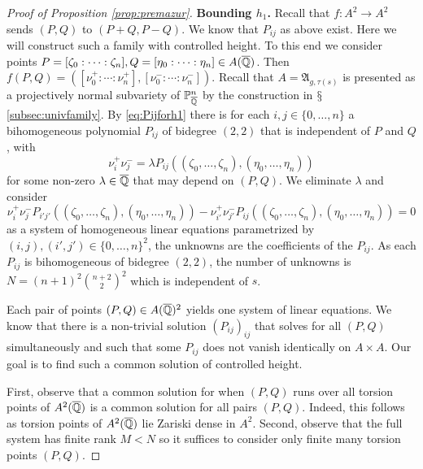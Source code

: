 \begin{proof}[Proof of Proposition \ref{prop:premazur}]
  \medskip
  \textbf{Bounding $h_1$.}\label{page:boundh1} %
  Recall that $f\colon A^2\rightarrow A^2$ sends $(P,Q)$ to
  $(P+Q,P-Q)$. We know that $P_{ij}$ as above exist. Here we will
  construct such a family with controlled height. To this end we
  consider points $P=[\zeta_0:\cdots:\zeta_n],Q=[\eta_0:\cdots:\eta_n]
  \in A({\overline{\mathbb{Q}}})$. Then $f(P,Q) = ([\nu^+_0:\cdots
  :\nu^+_n],[\nu^-_0:\cdots:\nu^-_n])$. Recall that
  $A=\mathfrak{A}_{g,\tau(s)}$ is presented as a projectively normal
  subvariety of ${\mathbb{P}}^n_{\overline{\mathbb{Q}}}$ by the construction in
  $\mathsection$\ref{subsec:univfamily}. By \eqref{eq:Pijforh1}  there
  is for each $i,j\in \{0,\ldots,n\}$
  a bihomogeneous polynomial $P_{ij}$ of bidegree $(2,2)$ that is
  independent of $P$ and $Q$, with
  \begin{equation}
    \label{eq:inhomlinearsystemforh1}
    \nu^+_i \nu^-_j = \lambda P_{ij}((\zeta_0,\ldots,\zeta_n),(\eta_0,\ldots,\eta_n))
  \end{equation}
  for some non-zero $\lambda\in{\overline{\mathbb{Q}}}$ that may depend on $(P,Q)$. 
  We  eliminate $\lambda$ and consider  
  \begin{equation}
    \label{eq:linearsystemforh1}
    \nu^+_i \nu^-_jP_{i'j'}((\zeta_0,\ldots,\zeta_n),(\eta_0,\ldots,\eta_n)) - \nu^+_{i'} \nu^-_{j'}P_{ij}((\zeta_0,\ldots,\zeta_n),(\eta_0,\ldots,\eta_n))=0
  \end{equation}
  as a system of homogeneous linear equations 
  parametrized by $(i,j),(i',j')\in \{0,\ldots,n\}^2$, the unknowns are
  the coefficients of the $P_{ij}$. As each $P_{ij}$ is bihomogeneous
  of bidegree $(2,2)$, the number of unknowns is
  $N=(n+1)^2 {n+2 \choose 2}^2$ which is independent of $s$. 

  Each pair of points $(P,Q)\in A({\overline{\mathbb{Q}}})^2$ yields one system of
  linear equations.
  We know that there is a non-trivial solution $(P_{ij})_{ij}$ that solves for all
  $(P,Q)$ simultaneously and such that some $P_{ij}$ does not vanish
  identically on $A\times A$. Our goal is to find such a common solution of
  controlled height.

  First, observe that a common solution  for when
  $(P,Q)$ runs over all torsion points of $A^2({\overline{\mathbb{Q}}})$ is a common
  solution for all pairs $(P,Q)$. Indeed, this follows as torsion
  points of $A^2({\overline{\mathbb{Q}}})$ lie Zariski dense in $A^2$. 
  Second, observe that the full system has finite rank $M< N$ so it
  suffices to consider only finite many torsion points $(P,Q)$.


\end{proof}
